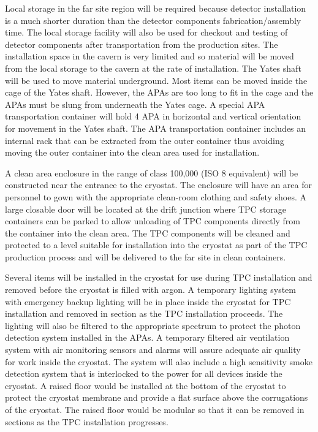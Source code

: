 Local storage in the far site region will be required because detector installation is a much shorter duration 
than the detector components fabrication/assembly time. The local storage facility will also be used for 
checkout and testing of detector components after transportation from the production sites. The 
installation space in the cavern is very limited and so material will be moved from the local storage to the 
cavern at the rate of installation. The Yates shaft will be used to move material underground. Most items 
can be moved inside the cage of the Yates shaft. However, the APAs are too long to fit in the cage and the 
APAs must be slung from underneath the Yates cage. A special APA transportation container will hold 4 
APA in horizontal and vertical orientation for movement in the Yates shaft.  The APA transportation 
container includes an internal rack that can be extracted from the outer container thus avoiding moving 
the outer container into the clean area used for installation.

A clean area enclosure in the range of class 100,000 (ISO 8 equivalent) will be constructed near the 
entrance to the cryostat. The enclosure will have an area for personnel to gown with the appropriate 
clean-room clothing and safety shoes. A large closable door will be located at the drift junction where 
TPC storage containers can be parked to allow unloading of TPC components directly from the container 
into the clean area. The TPC components will be cleaned and protected to a level suitable for installation 
into the cryostat as part of the TPC production process and will be delivered to the far site in clean 
containers.

Several items will be installed in the cryostat for use during TPC installation and removed before the 
cryostat is filled with argon. A temporary lighting system with emergency backup lighting will be in place 
inside the cryostat for TPC installation and removed in section as the TPC installation proceeds. The 
lighting will also be filtered to the appropriate spectrum to protect the photon detection system installed 
in the APAs. A temporary filtered air ventilation system with air monitoring sensors and alarms will assure 
adequate air quality for work inside the cryostat. The system will also include a high sensitivity smoke 
detection system that is interlocked to the power for all devices inside the cryostat. A raised floor would 
be installed at the bottom of the cryostat to protect the cryostat membrane and provide a flat surface 
above the corrugations of the cryostat. The raised floor would be modular so that it can be removed in 
sections as the TPC installation progresses.


